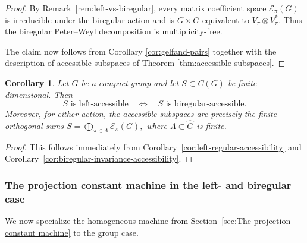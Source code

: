 \documentclass[11pt,showkeys]{amsart}
\newtheorem{corollary}[theorem]{Corollary}
\begin{document}
\begin{proof}
By Remark~\ref{rem:left-vs-biregular}, every matrix coefficient space
\(\mathcal E_\pi(G)\) is irreducible under the biregular action and is
\(G\times G\)-equivalent to \(V_\pi\otimes V_\pi^*\). Thus the
biregular Peter--Weyl decomposition is multiplicity-free.

The claim now follows from Corollary \ref{cor:gelfand-pairs} together with the description of accessible subspaces of Theorem \ref{thm:accessible-subspaces}.


\end{proof}


\begin{corollary}
\label{cor:left-biregular-accessible-subspaces}
Let \(G\) be a compact group and let \(S\subset C(G)\) be
finite-dimensional. Then
\[
    S \text{ is left-accessible}
    \quad\Longleftrightarrow\quad
    S \text{ is biregular-accessible}.
\]
Moreover, for either action, the accessible subspaces are precisely
the finite orthogonal sums
\(
    S
    =
    \bigoplus_{\pi\in\Lambda}
    \mathcal E_\pi(G),
\)
where \(\Lambda\subset\widehat G\) is finite.
\end{corollary}

\begin{proof}
This follows immediately from
Corollary~\ref{cor:left-regular-accessibility} and
Corollary~\ref{cor:biregular-invariance-accessibility}.
\end{proof}



\subsubsection{The projection constant machine in the left- and biregular case}
We now specialize the homogeneous machine
from Section~\ref{sec:The projection constant machine}
to the group case.
\end{document}
